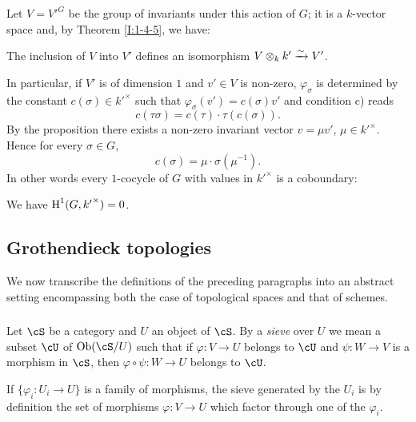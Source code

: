 Let $V={V'}^G$ be the group of invariants under this action of $G$; it is a 
$k$-vector space and, by Theorem \ref{I:1-4-5}, we have:

\begin{proposition}\label{I:1-5-2}
The inclusion of $V$ into $V'$ defines an isomorphism 
$V\otimes_k k' \xrightarrow\sim V'$.
\end{proposition}

In particular, if $V'$ is of dimension $1$ and $v'\in V$ is non-zero, 
$\varphi_\sigma$ is determined by the constant 
$c(\sigma)\in {k'}^\times$ such that $\varphi_\sigma(v')=c(\sigma)v'$ and 
condition c) reads 
\[
  c(\tau\sigma) = c(\tau)\cdot \tau(c(\sigma))\text{.}
\]
By the proposition there exists a non-zero invariant vector 
$v=\mu v'$, $\mu\in {k'}^\times$. Hence for every $\sigma\in G$, 
\[
  c(\sigma) = \mu\cdot \sigma(\mu^{-1})\text{.}
\]
In other words every $1$-cocycle of $G$ with values in ${k'}^\times$ is a 
coboundary: 

\begin{corollary}\label{I:1-5-3}
We have $\operatorname{H}^1(G,{k'}^\times)=0$.
\end{corollary}










\subsection{Grothendieck topologies}\label{I:1-6}

We now transcribe the definitions of the preceding paragraphs 
into an abstract setting encompassing both the case of topological spaces 
and that of schemes. 





\subsubsection{}\label{I:1-6-1}

Let $\cS$ be a category and $U$ an object of $\cS$. By a \emph{sieve} 
over $U$ we mean a subset $\cU$ of $\ob(\cS/U)$ such that if $\varphi:V\to U$ 
belongs to $\cU$ and $\psi:W\to V$ is a morphism in $\cS$, then 
$\varphi\circ\psi:W\to U$ belongs to $\cU$. 

If $\{\varphi_i:U_i\to U\}$ is a family of morphisms, the sieve 
generated by the $U_i$ is by definition the set of morphisms 
$\varphi:V\to U$ which factor through one of the $\varphi_i$. 

